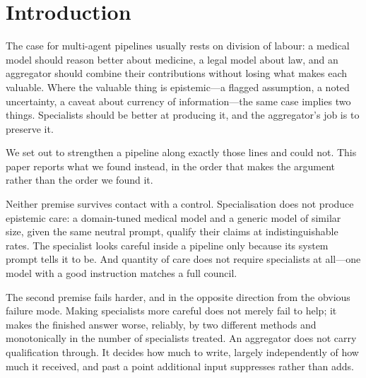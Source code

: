 \documentclass[11pt]{article}
\begin{document}
\begin{center}
\end{center}

\section{Introduction}
The case for multi-agent pipelines usually rests on division of labour: a
medical model should reason better about medicine, a legal model about law,
and an aggregator should combine their contributions without losing what makes
each valuable. Where the valuable thing is epistemic---a flagged assumption, a
noted uncertainty, a caveat about currency of information---the same case
implies two things. Specialists should be better at producing it, and the
aggregator's job is to preserve it.

We set out to strengthen a pipeline along exactly those lines and could not.
This paper reports what we found instead, in the order that makes the argument
rather than the order we found it.

Neither premise survives contact with a control. Specialisation does not
produce epistemic care: a domain-tuned medical model and a generic model of
similar size, given the same neutral prompt, qualify their claims at
indistinguishable rates. The specialist looks careful inside a pipeline only
because its system prompt tells it to be. And quantity of care does not require
specialists at all---one model with a good instruction matches a full council.

The second premise fails harder, and in the opposite direction from the
obvious failure mode. Making specialists more careful does not merely fail to
help; it makes the finished answer worse, reliably, by two different methods
and monotonically in the number of specialists treated. An aggregator does not
carry qualification through. It decides how much to write, largely
independently of how much it received, and past a point additional input
suppresses rather than adds.
\end{document}
